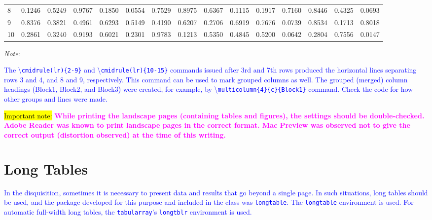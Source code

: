 \documentclass[phd,showframe]{ndsu-thesis-2022}
\newcommand\italk[1]{\textcolor{blue}{#1}}  %
\newcommand\cmd[1]{\textbackslash\texttt{#1}}  %
\newcommand\vb[1]{\textcolor{blue}{\texttt{#1}}}%
\begin{document}
\begin{landscape}
\begin{table}[p]
{\begin{tabular}{l  rrrr  cccc  llll  rr}
8 & 0.1246 & 0.5249 & 0.9767 & 0.1850 & 0.0554 & 0.7529 & 0.8975 & 0.6367 & 0.1115 & 0.1917 & 0.7160 & 0.8446 & 0.4325 & 0.0693 \\
\cmidrule(lr){10-15}
9 & 0.8376 & 0.3821 & 0.4961 & 0.6293 & 0.5149 & 0.4190 & 0.6207 & 0.2706 & 0.6919 & 0.7676 & 0.0739 & 0.8534 & 0.1713 & 0.8018 \\
10 & 0.2861 & 0.3240 & 0.9193 & 0.6021 & 0.2301 & 0.9783 & 0.1213 & 0.5350 & 0.4845 & 0.5200 & 0.0642 & 0.2804 & 0.7556 & 0.0147 \\
\bottomrule
\end{tabular}
}    
\begin{tablenotes}[flushleft]
\footnotesize
\item \hspace{-1ex} \emph{Note}: \italk{The \cmd{cmidrule(lr)\{2-9\}} and \cmd{cmidrule(lr)\{10-15\}} commands issued after 3rd and 7th rows produced the horizontal lines separating rows 3 and 4, and 8 and 9, respectively. This command can be used to mark grouped columns as well. The grouped (merged) column headings (Block1, Block2, and Block3) were created, for example, by \cmd{multicolumn\{4\}\{c\}\{Block1\}} command. Check the code for how other groups and lines were made.
\item \vspace{4ex}
\italk{\hl{Important note:}} \textcolor{magenta}{\bfseries While printing the landscape pages (containing tables and figures), the settings should be double-checked. Adobe Reader was known to print landscape pages in the correct format. Mac Preview was observed not to give the correct output (distortion observed) at the time of this writing.}
}  
\end{tablenotes}  
\label{tab212}
\end{table}
\end{landscape}



\mysectop
\section{Long Tables}
\italk{In the disquisition, sometimes it is necessary to present data and results that go beyond a single page. In such situations, long tables should be used, and the package developed for this purpose and included in the class was \vb{longtable}\cptp. The \vb{longtable} environment is used. For automatic full-width long tables, the \vb{tabularray}'s \vb{longtblr} environment is used.} 
\end{document}
